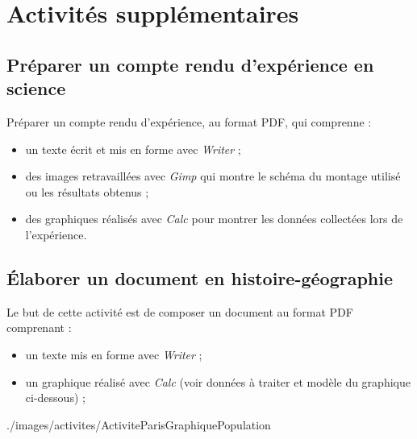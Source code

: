 \chapter{Activités supplémentaires}


 

\section{Préparer un compte rendu d'expérience en science}

Préparer un compte rendu d'expérience, au format PDF, qui comprenne :

\begin{itemize}
\item un texte écrit et mis en forme avec \emph{Writer} ;
\item des images retravaillées avec \emph{Gimp} qui montre le schéma du montage utilisé ou les résultats obtenus ;
\item des graphiques réalisés avec \emph{Calc} pour montrer les données collectées lors de l'expérience.
\end{itemize}








\section{Élaborer un document en histoire-géographie}



Le but de cette activité est de composer un document au format PDF comprenant :
\begin{itemize}
\item un texte mis en forme avec \emph{Writer} ;
\item un graphique réalisé avec \emph{Calc} (voir données à traiter et modèle du graphique ci-dessous) ;
\end{itemize}
%
              {./images/activites/ActiviteParisGraphiquePopulation}{\textwidth}



